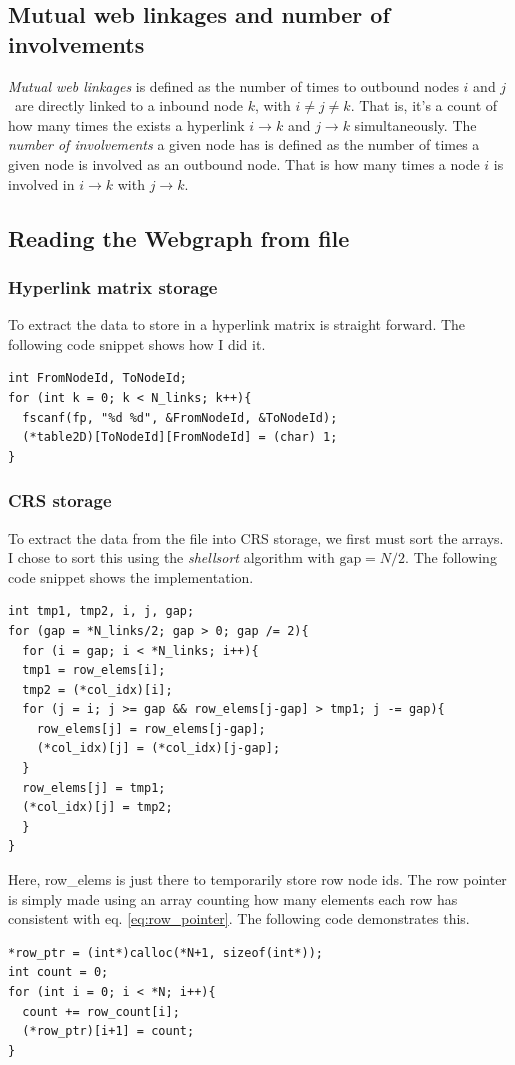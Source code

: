 \documentclass[english,notitlepage, reprint]{revtex4-1}  %
\begin{document}
\subsection*{Mutual web linkages and number of involvements}
\textit{Mutual web linkages} is defined as the number of times to outbound nodes $i$ and $j$ are directly linked to a inbound node $k$, with $i \neq j \neq k$. That is, it's a count of how many times the exists a hyperlink $i \to k$ and $j\to k$ simultaneously. The \textit{number of involvements} a given node has is defined as the number of times a given node is involved as an outbound node. That is how many times a node $i$ is involved in $i \to k$ with $j\to k$.

\subsection*{Reading the Webgraph from file}
\subsubsection{Hyperlink matrix storage}
To extract the data to store in a hyperlink matrix is straight forward. The following code snippet shows how I did it.  
\begin{lstlisting}[style=customc]
int FromNodeId, ToNodeId;
for (int k = 0; k < N_links; k++){
  fscanf(fp, "%d %d", &FromNodeId, &ToNodeId);
  (*table2D)[ToNodeId][FromNodeId] = (char) 1;
}
\end{lstlisting}

\subsubsection{CRS storage}
To extract the data from the file into CRS storage, we first must sort the arrays. I chose to sort this using the \textit{shellsort} algorithm with $\text{gap} = N/2$. The following code snippet shows the implementation.

\begin{lstlisting}[style=customc]
int tmp1, tmp2, i, j, gap;
for (gap = *N_links/2; gap > 0; gap /= 2){
  for (i = gap; i < *N_links; i++){
  tmp1 = row_elems[i];
  tmp2 = (*col_idx)[i];
  for (j = i; j >= gap && row_elems[j-gap] > tmp1; j -= gap){
    row_elems[j] = row_elems[j-gap];
    (*col_idx)[j] = (*col_idx)[j-gap];
  }
  row_elems[j] = tmp1;
  (*col_idx)[j] = tmp2;
  }
}
\end{lstlisting}
Here, row\_elems is just there to temporarily store row node ids. The row pointer is simply made using an array counting how many elements each row has consistent with eq. \eqref{eq:row_pointer}. The following code demonstrates this.
\begin{lstlisting}[style=customc]
*row_ptr = (int*)calloc(*N+1, sizeof(int*));
int count = 0;
for (int i = 0; i < *N; i++){
  count += row_count[i];
  (*row_ptr)[i+1] = count;
}
\end{lstlisting}
\end{document}
